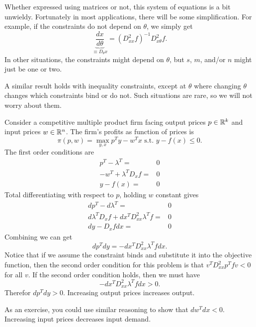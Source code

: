 Whether expressed using matrices or not, this system of equations is a
bit unwieldy. Fortunately in most applications, there will be some
simplification. For example, if the constraints do not depend on
$\theta$, we simply get 
\[ \underbrace{\frac{dx}{d\theta}}_{\equiv D_\theta x} = (D^2_{xx}
f)^{-1} D^2_{x\theta} f. \]
In other situations, the constraints might depend on $\theta$, but
$s$, $m$, and/or $n$ might just be one or two. 

A similar result holds with inequality constraints, except at $\theta$
where changing $\theta$ changes which constraints bind or do not. Such
situations are rare, so we will not worry about them.

\begin{example}
  Consider a competitive multiple product firm facing output prices $p
  \in \mathbb{R}^k$ and input
  prices $w \in \mathbb{R}^n$. The firm's profits as function of prices is
  \[ \pi(p,w) = \max_{y,x} p^T y - w^T x \text{ s.t. } y - f(x) \leq
  0. \]
  The first order conditions are
  \begin{align*}
    p^T - \lambda^T = & 0 \\
    -w^T + \lambda^T D_xf = & 0 \\
    y - f(x) = & 0 
  \end{align*}
  Total differentiating with respect to $p$, holding $w$ constant gives
  \begin{align*}
    dp^T - d\lambda^T = & 0 \\
    d\lambda^T D_x f  +  dx^T D^2_{xx}\lambda^T f  = & 0 \\
    dy - D_xf dx = & 0
  \end{align*}
  Combining we can get
  \[ dp^T dy = -dx^T D^2_{xx} \lambda^T f dx. \]
  Notice that if we assume the constraint binds and substitute it into
  the objective function, then the second order condition for this
  problem is that $v^T D^2_{xx} p^T f v < 0$ for all $v$. If the
  second order condition holds, then we must have 
  \[ -dx^T D^2_{xx} \lambda^T f dx > 0. \]
  Therefor $dp^T dy > 0$. Increasing output prices increases output. 
  
  As an exercise, you could use similar reasoning to show that $dw^T
  dx < 0$. Increasing input prices decreases input demand.
\end{example} 

\appendix


